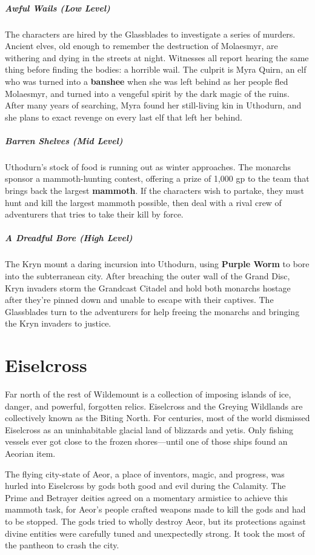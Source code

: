 \documentclass[10pt,a4paper,twoside,bg=print,twocolumn,openany,nodeprecatedcode]{dndbook}
\begin{document}
\subparagraph{Awful Wails (Low Level)}
The characters are hired by the Glassblades to investigate a series of murders. Ancient elves, old enough to remember the destruction of Molaesmyr, are withering and dying in the streets at night. Witnesses all report hearing the same thing before finding the bodies: a horrible wail. The culprit is Myra Quirn, an elf who was turned into a \textbf{banshee} when she was left behind as her people fled Molaesmyr, and turned into a vengeful spirit by the dark magic of the ruins. After many years of searching, Myra found her still-living kin in Uthodurn, and she plans to exact revenge on every last elf that left her behind.

\subparagraph{Barren Shelves (Mid Level)}
Uthodurn's stock of food is running out as winter approaches. The monarchs sponsor a mammoth-hunting contest, offering a prize of 1,000 gp to the team that brings back the largest \textbf{mammoth}. If the characters wish to partake, they must hunt and kill the largest mammoth possible, then deal with a rival crew of adventurers that tries to take their kill by force.

\subparagraph{A Dreadful Bore (High Level)}
The Kryn mount a daring incursion into Uthodurn, using \textbf{Purple Worm} to bore into the subterranean city. After breaching the outer wall of the Grand Disc, Kryn invaders storm the Grandcast Citadel and hold both monarchs hostage after they're pinned down and unable to escape with their captives. The Glassblades turn to the adventurers for help freeing the monarchs and bringing the Kryn invaders to justice.

\section{Eiselcross}
Far north of the rest of Wildemount is a collection of imposing islands of ice, danger, and powerful, forgotten relics. Eiselcross and the Greying Wildlands are collectively known as the Biting North. For centuries, most of the world dismissed Eiselcross as an uninhabitable glacial land of blizzards and yetis. Only fishing vessels ever got close to the frozen shores—until one of those ships found an Aeorian item.

The flying city-state of Aeor, a place of inventors, magic, and progress, was hurled into Eiselcross by gods both good and evil during the Calamity. The Prime and Betrayer deities agreed on a momentary armistice to achieve this mammoth task, for Aeor's people crafted weapons made to kill the gods and had to be stopped. The gods tried to wholly destroy Aeor, but its protections against divine entities were carefully tuned and unexpectedly strong. It took the most of the pantheon to crash the city.
\end{document}
